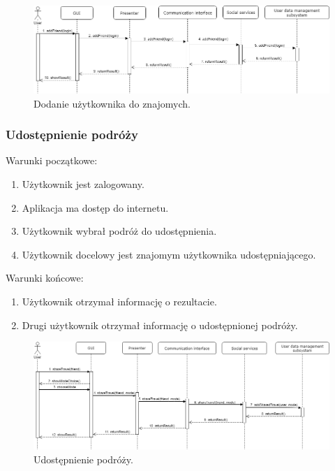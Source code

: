 \documentclass[10pt,twoside,a4paper]{report}
\begin{document}
\noindent\newline
\begin{figure}[h]
\centering
\includegraphics[width=\linewidth]{addFriend}
\caption{Dodanie użytkownika do znajomych.}
\label{fig:addFriend}
\end{figure}
\FloatBarrier
\subsubsection{Udostępnienie podróży}

\noindent Warunki początkowe:
\begin{enumerate}
  \item Użytkownik jest zalogowany.
  \item Aplikacja ma dostęp do internetu.
  \item Użytkownik wybrał podróż do udostępnienia.
  \item Użytkownik docelowy jest znajomym użytkownika udostępniającego.
\end{enumerate}
\par
\noindent\newline
Warunki końcowe:
\begin{enumerate}
  \item Użytkownik otrzymał informację o rezultacie.
  \item Drugi użytkownik otrzymał informację o udostępnionej podróży.
\end{enumerate}

\noindent\newline
\begin{figure}[h]
\centering
\includegraphics[width=\linewidth]{shareTravel}
\caption{Udostępnienie podróży.}
\label{fig:shareTravel}
\end{figure}
\end{document}
